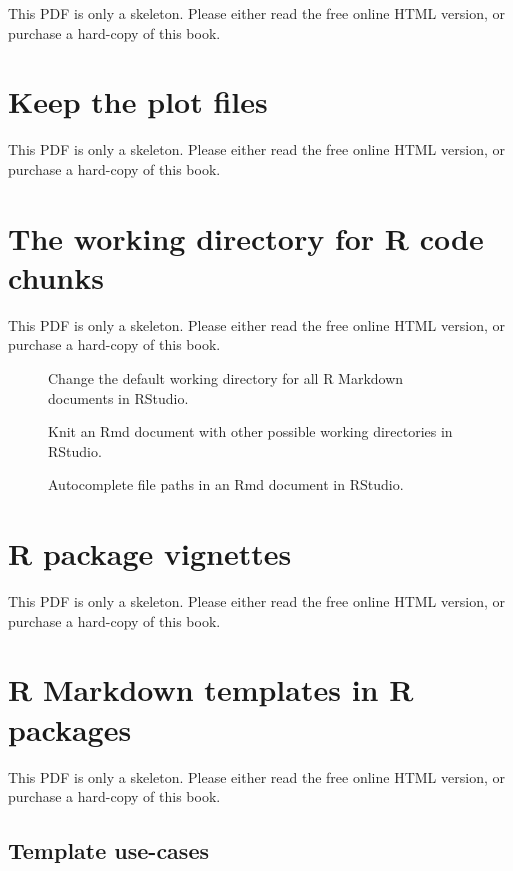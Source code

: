 \documentclass[
  11pt,
]{krantz}
\begin{document}
This PDF is only a skeleton. Please either read the free online HTML version, or purchase a hard-copy of this book.

\section{Keep the plot files}\label{keep-files}

This PDF is only a skeleton. Please either read the free online HTML version, or purchase a hard-copy of this book.

\section{The working directory for R code chunks}\label{working-directory}

This PDF is only a skeleton. Please either read the free online HTML version, or purchase a hard-copy of this book.

\begin{figure}\caption{Change the default working directory for all R Markdown documents in RStudio.}\end{figure}

\begin{figure}\caption{Knit an Rmd document with other possible working directories in RStudio.}\end{figure}

\begin{figure}\caption{Autocomplete file paths in an Rmd document in RStudio.}\end{figure}

\section{R package vignettes}\label{package-vignette}

This PDF is only a skeleton. Please either read the free online HTML version, or purchase a hard-copy of this book.

\section{R Markdown templates in R packages}\label{package-template}

This PDF is only a skeleton. Please either read the free online HTML version, or purchase a hard-copy of this book.

\subsection{Template use-cases}\label{template-use-cases}
\end{document}
